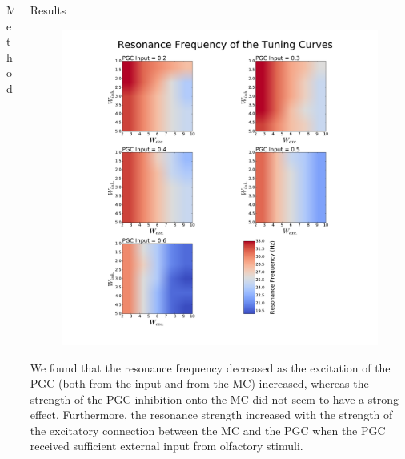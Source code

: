 \documentclass[final,hyperref={pdfpagelabels=false}]{beamer}
\begin{document}
\begin{frame}{}
\begin{columns}[t]
\begin{column}{.48\linewidth}
\begin{block}{Method}
\end{block}

\end{column}




    \begin{column}{.48\linewidth}
      \begin{block}{Results}
      	\begin{figure}
      		\center
      		\includegraphics[scale=0.5]{images/Contour_plot_tuning_frequency}
      		\end{figure} 
        We found that the resonance frequency decreased as the excitation of the PGC (both from the input and from the MC) increased, whereas the strength of the PGC inhibition onto the MC did not seem to have a strong effect. 
        Furthermore, the resonance strength increased with the strength of the excitatory connection between the MC and the PGC when the PGC received sufficient external input from olfactory stimuli.
      \end{block}


\end{column}
\end{columns}
\end{frame}
\end{document}
